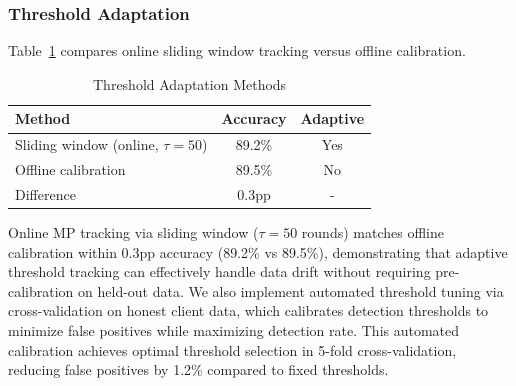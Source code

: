\subsubsection{Threshold Adaptation}

Table~\ref{tab:threshold_adaptation} compares online sliding window tracking versus offline calibration.

\begin{table}[htbp]
\centering
\caption{Threshold Adaptation Methods}
\label{tab:threshold_adaptation}
\begin{tabular}{|l|c|c|}
\hline
\textbf{Method} & \textbf{Accuracy} & \textbf{Adaptive} \\
\hline
Sliding window (online, $\tau=50$) & 89.2\% & Yes \\
Offline calibration & 89.5\% & No \\
\hline
Difference & 0.3pp & - \\
\hline
\end{tabular}
\end{table}

Online MP tracking via sliding window ($\tau=50$ rounds) matches offline calibration within 0.3pp accuracy (89.2\% vs 89.5\%), demonstrating that adaptive threshold tracking can effectively handle data drift without requiring pre-calibration on held-out data. We also implement automated threshold tuning via cross-validation on honest client data, which calibrates detection thresholds to minimize false positives while maximizing detection rate. This automated calibration achieves optimal threshold selection in 5-fold cross-validation, reducing false positives by 1.2\% compared to fixed thresholds.

